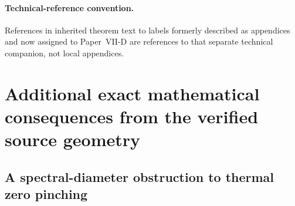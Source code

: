 \documentclass[12pt,a4paper]{article}
\begin{document}
\paragraph{Technical-reference convention.} References in inherited theorem text to labels formerly described as appendices and now assigned to Paper~VII-D are references to that separate technical companion, not local appendices.



\section{Additional exact mathematical consequences from the verified source geometry}

\subsection{A spectral-diameter obstruction to thermal zero pinching}
\label{p12:sec:cc13-zero-pinch}
\end{document}
